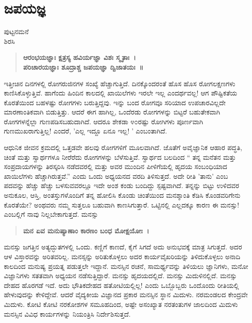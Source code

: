 {\fontsize{14}{16}\selectfont
\chapter{ಜಪಯಜ್ಞ}

\begin{center}
\smallskip
ಪುಟ್ಟನಮನೆ\\ 
ಶಿರಸಿ
\addrule
\end{center}

\begin{verse}
\textbf{ಆರಂಭಯಜ್ಞಾಃ ಕ್ಷತ್ರಸ್ಯ ಹವಿರ್ಯಜ್ಞಾ ವಿಶಃ ಸ್ಮೃತಾಃ~। \\
ಪರಿಚಾರಯಜ್ಞಾಃ ಶೂದ್ರಾಶ್ಚ ಜಪಯಜ್ಞಾ ದ್ವಿಜಾತಯಃ~॥}
\end{verse}
ಇತ್ತೀಚಿನ ದಿನಗಳಲ್ಲಿ ರೋಗರುಜಿನಗಳ ಸಂಖ್ಯೆ ಹೆಚ್ಚಾಗುತ್ತಿದೆ. ದಿನಕ್ಕೊಂದರಂತೆ ಹೊಸ ಹೊಸ ರೋಗಲಕ್ಷಣಗಳು ಕಾಣಿಸಿಕೊಳ್ಳುತ್ತಿವೆ. ಹಾಗೆಂದು ಹಿಂದಿನ ಕಾಲದಲ್ಲಿ ಖಾಯಿಲೆಗಳು ಇರಲೇ ಇಲ್ಲ ಎಂದರ್ಥವಲ್ಲ! ಆಗ ಪೌಷ್ಟಿಕತೆಯ ಕೊರತೆಯಿಂದ ಬಹಳಷ್ಟು ರೋಗಗಳು ಬರುತ್ತಿದ್ದವು. ಇನ್ನು ಬಂದ ರೋಗವೂ ಸರಿಯಾದ ಉಪಚಾರವಿಲ್ಲದೇ ಮಾರಣಾಂತಿಕವಾಗಿ ಬಿಡುತ್ತಿತ್ತು. ಆದರೆ ಈಗ ಹಾಗಿಲ್ಲ, ಒಂದೆರಡು ರೋಗಗಳನ್ನು ಬಿಟ್ಟರೆ ಬಹುತೇಕವಾಗಿ ರೋಗಗಳನ್ನೆಲ್ಲಾ ಗುಣಪಡಿಸಬಹುದಾಗಿದೆ. ಆದರೂ ಶೇಕಡಾ ೪೦ರಷ್ಟು ರೋಗಿಗಳು ಪೂರ್ಣವಾಗಿ ಗುಣಮುಖರಾಗುತ್ತಿಲ್ಲ! ಎಂದರೆ, ’ಎಲ್ಲ ಇದ್ದೂ ಏನೂ ಇಲ್ಲ! ’ ಎಂಬಂತಾಗಿದೆ.

ಆಧುನಿಕ ಜೀವನ ಕ್ರಮದಲ್ಲಿ ಒತ್ತಡವೇ ಹಲವು ರೋಗಗಳಿಗೆ ಮೂಲವಾಗಿದೆ. ಜೊತೆಗೆ ಅವೈಜ್ಞಾನಿಕ ಆಹಾರ ಪದ್ಧತಿ, ಚಿಂತೆ ಮತ್ತು ಸ್ವಾರ್ಥಗಳೂ ನೀರೆರೆದು ರೋಗಗಳನ್ನು ಬೆಳೆಸುತ್ತಿವೆ. ಸ್ವಾರ್ಥದ ಬಲದಿಂದ “ ತನ್ನ ಮನೆತನ ಮತ್ತು ಸಂಪ್ರದಾಯಗಳನ್ನು ತಿರಸ್ಕರಿಸಿ ನಡೆದವರಲ್ಲಿ ಮತ್ತು ಅವರ ಮುಂದಿನ ಪೀಳಿಗೆಯಲ್ಲಿ ಹೃದಯ ಸಂಬಂಧಿಯಾದ ಖಾಯಿಲೆಗಳು ಹೆಚ್ಚಾಗಿರುತ್ತವೆ.” ಎಂದು ಒಂದು ಅಧ್ಯಯನದ ವರದಿ ತಿಳಿಸುತ್ತದೆ. ಅದೇ ರೀತಿ ’ತಾನು’ ಎಂಬ ಪದವನ್ನು ಹೆಚ್ಚು ಹೆಚ್ಚು ಬಳಸುವವರಲ್ಲೂ ಇದೇ ಅಂಶ ಕಂಡು ಬಂದಿದ್ದು ಸ್ಪಷ್ಟವಾಗಿದೆ. ತನ್ನನ್ನು ಬಿಟ್ಟು ಉಳಿದವರ ಅನುಕೂಲ, ಆಸ್ತಿ, ಅಂತಸ್ತುಗಳೊಂದಿಗೆ ತನ್ನ ಹೋಲಿಸಿ ಕೊಂಡು ಚಿಂತೆಯಿಂದ ಮನಶ್ಶಾಂತಿ ಕೆಡಿಸಿ ಕೊಂಡವರಿಗೇನು ಕೊರತೆಯೇ? ಅಂಥವರು ನಮ್ಮ ಸುತ್ತಲೂ ಬಹುವಾಗಿ ಕಾಣಸಿಗುತ್ತಾರೆ. ಒಟ್ಟಿನಲ್ಲಿ ಎಲ್ಲದಕ್ಕೂ ಕಾರಣ ಈ ಮನಸ್ಸು! ಎಂಬಲ್ಲಿಗೆ ನಾವು ನಿಲ್ಲಬೇಕಾಗುತ್ತದೆ. ಮನಸ್ಸು
\begin{verse}  
\textbf{ಮನ ಏವ ಮನುಷ್ಯಾಣಾಂ ಕಾರಣಂ ಬಂಧ ಮೋಕ್ಷಯೋಃ~। }
\end{verse}
ಮನಸ್ಸು ಜಗತ್ತಿನ ಅತ್ಯದ್ಭುತಗಳಲ್ಲಿ ಒಂದು. ಕಣ್ಣಿಗೆ ಕಾಣದೆ, ಕೈಗೆ ಸಿಗದೆ ಅದು ಅನುಭವಕ್ಕೆ ಮಾತ್ರ ಸಿಗುತ್ತದೆ. ಅದರ ಆಳ ವಿಸ್ತಾರವನ್ನು ಅರಿತವರಿಲ್ಲ. ಮನಸ್ಸನ್ನು ಅರಿತುಕೊಳ್ಳಲು ಅದರ ಕಾರ್ಯವೈಖರಿಯನ್ನು ತಿಳಿದುಕೊಳ್ಳಲು ಅನಾದಿ ಕಾಲದಿಂದ ಮನುಷ್ಯ ಪ್ರಯತ್ನ ಪಡುತ್ತಲೇ ಇದ್ದಾನೆ. ಮನಸ್ಸಿನ ರಚನೆ, ಸಾಮರ್ಥ್ಯವನ್ನು ತಿಳಿಯಲು ಜ್ಞಾನಿಗಳು, ಮನೋ ವಿಜ್ಞಾನಿಗಳು ಸತತವಾಗಿ ಅಧ್ಯಯನ ನಡೆಸುತ್ತಿದ್ದಾರೆ. ಮನಸ್ಸು ಹೃದಯದಲ್ಲಿದೆ. ಮನಸ್ಸು ಮಿದುಳಿನಲ್ಲಿದೆ. ಮನಸ್ಸು ದೇಹದ ಹೊರಗಡೆ ಇದೆ. ಅದು ಭೌತಿಕದೇಹದ ಹತೋಟಿಯಲ್ಲಿಲ್ಲ! ಎಂದು ಒಬ್ಬೊಬ್ಬರು ಒಂದೊಂದು ರೀತಿಯಲ್ಲಿ ಹೇಳುವುದನ್ನು ಕೇಳಿದ್ದೇವೆ. ಆದರೆ ವೈದ್ಯಕೀಯ ವಿಜ್ಞಾನದ ಪ್ರಕಾರ ಮನಸ್ಸಿನ ಸ್ಥಾನ ಮಿದುಳು. ನರಮಂಡಲದ ಕೇಂದ್ರವೇ ಮಿದುಳು. ಕೋಟಿ ಕೋಟಿ ನರಕೋಶಗಳ ಸಮೂಹದಿಂದ, ಅಷ್ಟೇ ಅಸಂಖ್ಯಾತ ನರತಂತುಗಳ ಜಾಲದಿಂದ ಮಿದುಳು ಮನಸ್ಸಿನ ವಿವಿಧ ಕಾರ್ಯಗಳನ್ನು ನಿಯಂತ್ರಿಸಿ ನಿರ್ದೇಶಿಸುತ್ತದೆ.

}
